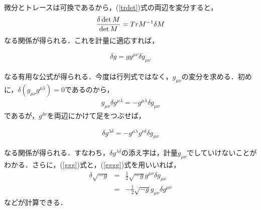 微分とトレースは可換であるから，(\ref{trdet})式の両辺を変分すると，
\begin{eqnarray}
{\delta \det M\over \det M}=Tr M^{-1}\delta M
\end{eqnarray}
なる関係が得られる．これを計量に適応すれば，
\begin{empheqboxed}
\begin{eqnarray}
\label{ggg}
\delta g=g g^{\mu\nu}\delta g_{\mu\nu}
\end{eqnarray}
\end{empheqboxed}
なる有用な公式が得られる．今度は行列式ではなく，$g_{\mu\nu}$の変分を求める．初めに，$\delta(g_{\mu\nu}g^{\mu\lambda})=0$であるのから，
\begin{eqnarray}
g_{\mu\nu}\delta g^{\mu\lambda}=-g^{\mu\lambda}\delta g_{\mu\nu}
\end{eqnarray}
であるが，$g^{\delta \nu}$を両辺にかけて足をつぶせば，
\begin{empheqboxed}
\begin{eqnarray}
\label{gggg}
\delta g^{\lambda\delta }=-g^{\mu\lambda}g^{\nu\delta}\delta g_{\mu\nu}
\end{eqnarray}
\end{empheqboxed}
なる関係が得られる．すなわち，$\delta g^{\lambda\delta }$の添え字は，計量$g_{\mu\nu}$でしていけないことがわかる．さらに，(\ref{ggg})式と，(\ref{gggg})式を用いいれば，
\begin{eqnarray}
\label{hen-g}
\delta\sqrt{-g}&=&\frac{1}{2}\sqrt{-g}g^{\mu\nu}\delta g_{\mu\nu} \\
&=&-\frac{1}{2}\sqrt{-g}g_{\mu\nu}\delta g^{\mu\nu}
\end{eqnarray}
などが計算できる．
